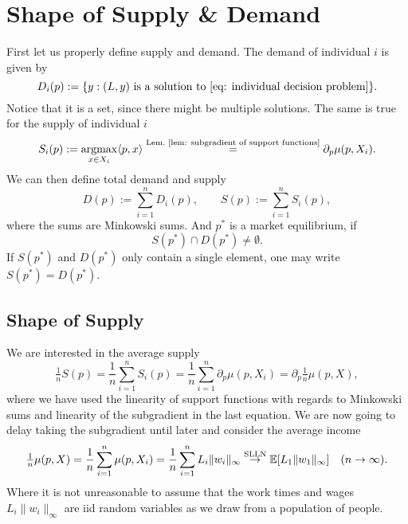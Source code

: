 \section{Shape of Supply \& Demand}
\label{sec: shape supply/demand}

First let us properly define supply and demand. The demand of individual \(i\)
is given by
\[
	D_i(p) := \{
		y : (L,y)
		\text{ is a solution to \eqref{eq: individual decision problem}}
	\}.
\]
Notice that it is a set, since there might be multiple solutions. The same is
true for the supply of individual \(i\)
\[
	S_i(p) := \operatorname*{argmax}_{x\in X_i} \langle p, x\rangle 
	\overset{\text{Lem.~\ref{lem: subgradient of support functions}}}=
	\partial_p \mu(p, X_i).
\]
We can then define total demand and supply
\[
	D(p) := \sum_{i=1}^n D_i(p),
	\qquad
	S(p) := \sum_{i=1}^n S_i(p),
\]
where the sums are Minkowski sums.
And \(p^*\) is a market equilibrium, if
\[
	S(p^*)\cap D(p^*)\neq\emptyset.
\]
If \(S(p^*)\) and \(D(p^*)\) only contain a single element, one may write
\(S(p^*)=D(p^*)\).

\subsection{Shape of Supply}

We are interested in the average supply
\[
	\tfrac1n S(p) = \frac1n \sum_{i=1}^n S_i(p)
	= \frac1n\sum_{i=1}^n \partial_p\mu(p, X_i)
	= \partial_p \tfrac1n \mu(p, X),
\]
where we have used the linearity of support functions with regards to Minkowski
sums and linearity of the subgradient in the last equation. We are now going to
delay taking the subgradient until later and consider the average income
\[
	\tfrac1n \mu(p,X)
	= \frac1n \sum_{i=1}^n \mu(p, X_i)
	= \frac1n \sum_{i=1}^n L_i \|w_i\|_\infty
	\overset{\text{SLLN}}\to \mathbb{E}[L_1 \|w_1\|_\infty] \quad (n\to\infty).
\]
Where it is not unreasonable to assume that the work times and wages
\(L_i\|w_i\|_\infty\) are iid random variables as we draw from a population of
people.

